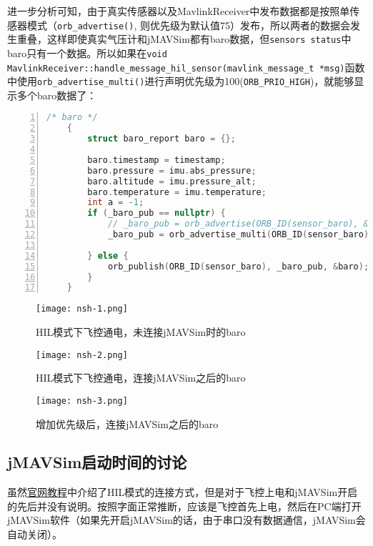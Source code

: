 进一步分析可知，由于真实传感器以及MavlinkReceiver中发布数据都是按照单传感器模式（\texttt{orb_advertise()}, 则优先级为默认值75）发布，所以两者的数据会发生重叠，这样即使真实气压计和jMAVSim都有baro数据，但\texttt{sensors status}中baro只有一个数据。所以如果在\texttt{void MavlinkReceiver::handle_message_hil_sensor(mavlink_message_t *msg)}函数中使用\texttt{orb_advertise_multi()}进行声明优先级为100(\texttt{ORB_PRIO_HIGH})，就能够显示多个baro数据了：
\begin{lstlisting}[language=C++,numbers=left,firstnumber = 1,breaklines = true,numberstyle=\tiny,keywordstyle=\color{blue!70},commentstyle=\color{red!50!green!50!blue!50},frame=shadowbox, rulesepcolor=\color{red!20!green!20!blue!20}]
	/* baro */
	{
		struct baro_report baro = {};

		baro.timestamp = timestamp;
		baro.pressure = imu.abs_pressure;
		baro.altitude = imu.pressure_alt;
		baro.temperature = imu.temperature;
		int a = -1;
		if (_baro_pub == nullptr) {
			// _baro_pub = orb_advertise(ORB_ID(sensor_baro), &baro);
			_baro_pub = orb_advertise_multi(ORB_ID(sensor_baro), &baro, &a, ORB_PRIO_HIGH);

		} else {
			orb_publish(ORB_ID(sensor_baro), _baro_pub, &baro);
		}
	}
\end{lstlisting}

\begin{figure}[htbp]
	\figskip
	\centering
	\texttt{[image: nsh-1.png]}	  
	\caption{\label{fig: sensors2} HIL模式下飞控通电，未连接jMAVSim时的baro}
\end{figure}

\begin{figure}[htbp]
	\figskip
	\centering
	\texttt{[image: nsh-2.png]}	  
	\caption{\label{fig: sensors3} HIL模式下飞控通电，连接jMAVSim之后的baro}
\end{figure}

\begin{figure}[htbp]
	\figskip 
	\centering
	\texttt{[image: nsh-3.png]}	  
	\caption{\label{fig: sensors4} 增加优先级后，连接jMAVSim之后的baro}
\end{figure}

\subsection{jMAVSim启动时间的讨论}
虽然\href{http://www.pixhawk.com/dev/hil/jmavsim#hardware_in_the_loop_hitl}{官网教程}中介绍了HIL模式的连接方式，但是对于飞控上电和jMAVSim开启的先后并没有说明。按照字面正常推断，应该是飞控首先上电，然后在PC端打开jMAVSim软件（如果先开启jMAVSim的话，由于串口没有数据通信，jMAVSim会自动关闭）。

